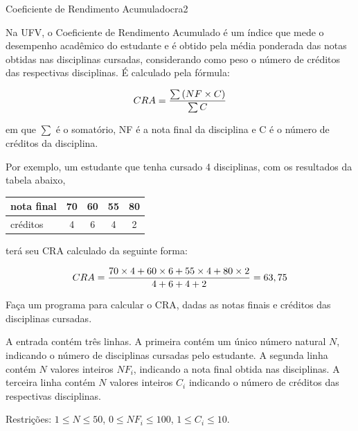 \documentclass[12pt,a4paper,oneside]{article}
\begin{document}
\begin{problem}{Coeficiente de Rendimento Acumulado}{cra}{2}
 
Na UFV, o Coeficiente de Rendimento Acumulado é um índice que mede o desempenho acadêmico do estudante e é obtido pela média ponderada das notas obtidas nas disciplinas cursadas, considerando como peso o número de créditos das respectivas disciplinas. É calculado pela fórmula:

\vspace{-6pt}
\begin{equation}
    CRA = \frac{\sum{(NF \times C})}{\sum{C}}\notag
\end{equation}

\vspace{-6pt}
em que $\sum{}$ é o somatório, NF é a nota final da disciplina e C é o número de créditos da disciplina.

Por exemplo, um estudante que tenha cursado 4 disciplinas, com os resultados da tabela abaixo,

\begin{center}
\begin{tabular}{|l|cccc|}
    \hline
    nota final  & 70 & 60 & 55 & 80 \\
    \hline
    créditos    & 4  & 6  &  4 &  2 \\
    \hline
\end{tabular}
\end{center}

terá seu CRA calculado da seguinte forma:

\begin{equation}
    CRA = \frac{70\times4 + 60\times6 + 55\times4 + 80\times 2}{4+6+4+2} = 63,75\notag
\end{equation}

Faça um programa para calcular o CRA, dadas as notas finais e créditos das disciplinas cursadas.

%

\InputFile

A entrada contém três linhas. A primeira contém um único número natural $N$, indicando o número de disciplinas cursadas pelo estudante. A segunda linha contém $N$ valores inteiros $NF_i$, indicando a nota final obtida nas disciplinas. A terceira linha contém $N$ valores inteiros $C_i$ indicando o número de créditos das respectivas disciplinas.

Restrições: $1 \leq N \leq 50$, $0 \leq NF_i \leq 100$, $1 \leq C_i \leq 10$.



\end{problem}
\end{document}
